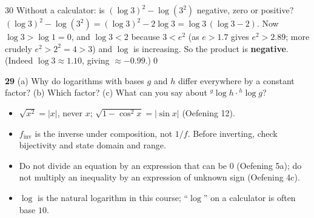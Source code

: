 \begin{bookex}{30}
Without a calculator: is $(\log3)^2-\log(3^2)$ negative, zero or positive?
\solution
$(\log3)^2-\log(3^2)=(\log3)^2-2\log3=\log3\,(\log3-2)$. Now $\log3>\log1=0$, and $\log3<2$ because $3<e^2$ (as $e>1.7$ gives $e^2>2.89$; more crudely $e^2>2^2=4>3$) and $\log$ is increasing. So the product is \textbf{negative}. (Indeed $\log3\approx1.10$, giving $\approx-0.99$.)\qed
\end{bookex}

\begin{trybox}[{29}]
\textbf{29} (a) Why do logarithms with bases $g$ and $h$ differ everywhere by a constant factor? (b) Which factor? (c) What can you say about ${}^g\!\log h\cdot{}^h\!\log g$?
\end{trybox}

\begin{warn}
\begin{itemize}
\item $\sqrt{x^2}=|x|$, never $x$; $\sqrt{1-\cos^2x}=|\sin x|$ (Oefening 12).
\item $f_{\mathrm{inv}}$ is the inverse under composition, not $1/f$. Before inverting, check bijectivity and state domain and range.
\item Do not divide an equation by an expression that can be $0$ (Oefening 5a); do not multiply an inequality by an expression of unknown sign (Oefening 4c).
\item $\log$ is the natural logarithm in this course; ``$\log$'' on a calculator is often base $10$.
\end{itemize}
\end{warn}
